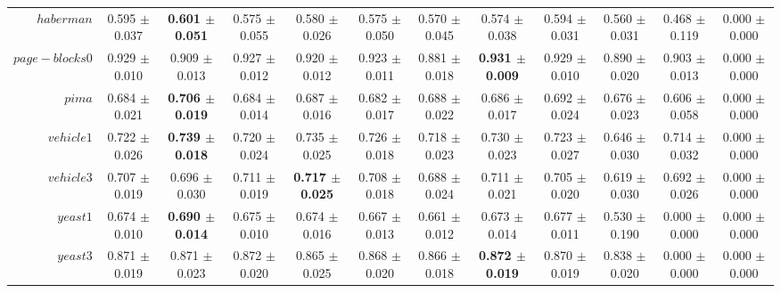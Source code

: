 \begin{table}[!ht]
{\begin{tabular}{r c c c c c c c c c c c}
$haberman$ & 0.595 $\pm$ 0.037 & \textbf{0.601 $\pm$ 0.051} & 0.575 $\pm$ 0.055 & 0.580 $\pm$ 0.026 & 0.575 $\pm$ 0.050 & 0.570 $\pm$ 0.045 & 0.574 $\pm$ 0.038 & 0.594 $\pm$ 0.031 & 0.560 $\pm$ 0.031 & 0.468 $\pm$ 0.119 & 0.000 $\pm$ 0.000 \\
$page-blocks0$ & 0.929 $\pm$ 0.010 & 0.909 $\pm$ 0.013 & 0.927 $\pm$ 0.012 & 0.920 $\pm$ 0.012 & 0.923 $\pm$ 0.011 & 0.881 $\pm$ 0.018 & \textbf{0.931 $\pm$ 0.009} & 0.929 $\pm$ 0.010 & 0.890 $\pm$ 0.020 & 0.903 $\pm$ 0.013 & 0.000 $\pm$ 0.000 \\
$pima$ & 0.684 $\pm$ 0.021 & \textbf{0.706 $\pm$ 0.019} & 0.684 $\pm$ 0.014 & 0.687 $\pm$ 0.016 & 0.682 $\pm$ 0.017 & 0.688 $\pm$ 0.022 & 0.686 $\pm$ 0.017 & 0.692 $\pm$ 0.024 & 0.676 $\pm$ 0.023 & 0.606 $\pm$ 0.058 & 0.000 $\pm$ 0.000 \\
$vehicle1$ & 0.722 $\pm$ 0.026 & \textbf{0.739 $\pm$ 0.018} & 0.720 $\pm$ 0.024 & 0.735 $\pm$ 0.025 & 0.726 $\pm$ 0.018 & 0.718 $\pm$ 0.023 & 0.730 $\pm$ 0.023 & 0.723 $\pm$ 0.027 & 0.646 $\pm$ 0.030 & 0.714 $\pm$ 0.032 & 0.000 $\pm$ 0.000 \\
$vehicle3$ & 0.707 $\pm$ 0.019 & 0.696 $\pm$ 0.030 & 0.711 $\pm$ 0.019 & \textbf{0.717 $\pm$ 0.025} & 0.708 $\pm$ 0.018 & 0.688 $\pm$ 0.024 & 0.711 $\pm$ 0.021 & 0.705 $\pm$ 0.020 & 0.619 $\pm$ 0.030 & 0.692 $\pm$ 0.026 & 0.000 $\pm$ 0.000 \\
$yeast1$ & 0.674 $\pm$ 0.010 & \textbf{0.690 $\pm$ 0.014} & 0.675 $\pm$ 0.010 & 0.674 $\pm$ 0.016 & 0.667 $\pm$ 0.013 & 0.661 $\pm$ 0.012 & 0.673 $\pm$ 0.014 & 0.677 $\pm$ 0.011 & 0.530 $\pm$ 0.190 & 0.000 $\pm$ 0.000 & 0.000 $\pm$ 0.000 \\
$yeast3$ & 0.871 $\pm$ 0.019 & 0.871 $\pm$ 0.023 & 0.872 $\pm$ 0.020 & 0.865 $\pm$ 0.025 & 0.868 $\pm$ 0.020 & 0.866 $\pm$ 0.018 & \textbf{0.872 $\pm$ 0.019} & 0.870 $\pm$ 0.019 & 0.838 $\pm$ 0.020 & 0.000 $\pm$ 0.000 & 0.000 $\pm$ 0.000 \\
\end{tabular}}
\end{table}
